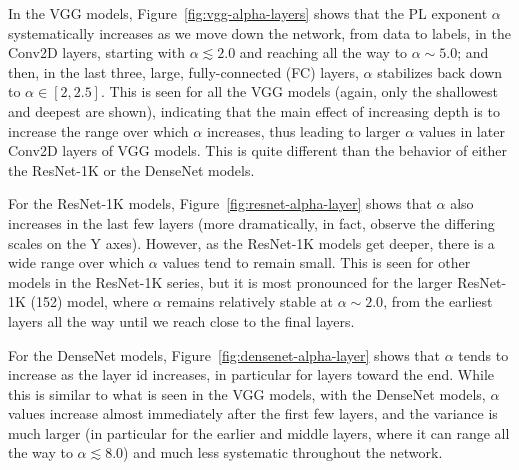 In the VGG models, Figure~\ref{fig:vgg-alpha-layers} shows that the PL exponent $\alpha$ systematically increases as we move down the network, from data to labels, in the Conv2D layers, starting with $\alpha\lesssim 2.0$ and reaching all the way to $\alpha\sim 5.0$; and then, in the last three, large, fully-connected (FC) layers, $\alpha$ stabilizes back down to $\alpha\in[2,2.5]$.
This is seen for all the VGG models (again, only the shallowest and deepest are shown), indicating that the main effect of increasing depth is to increase the range over which $\alpha$ increases, thus leading to larger $\alpha$ values in later Conv2D layers of VGG models.
This is quite different than the behavior of either the ResNet-1K or the DenseNet models.

For the ResNet-1K models, Figure~\ref{fig:resnet-alpha-layer} shows that $\alpha$ also increases in the last few layers (more dramatically, in fact, observe the differing scales on the Y axes).
However, as the ResNet-1K models get deeper, there is a wide range over which $\alpha$ values tend to remain small.
This is seen for other models in the ResNet-1K series, but it is most pronounced for the larger ResNet-1K (152) model, where $\alpha$ remains relatively stable at $\alpha\sim 2.0$, from the earliest layers all the way until we reach close to the final layers.  

For the DenseNet models, Figure~\ref{fig:densenet-alpha-layer} shows that $\alpha$ tends to increase as the layer id increases, in particular for layers toward the end.
While this is similar to what is seen in the VGG models, with the DenseNet models, $\alpha$ values increase almost immediately after the first few layers, and the variance is much larger (in particular for the earlier and middle layers, where it can range all the way to $\alpha\lesssim 8.0$) and much less systematic throughout the network.

